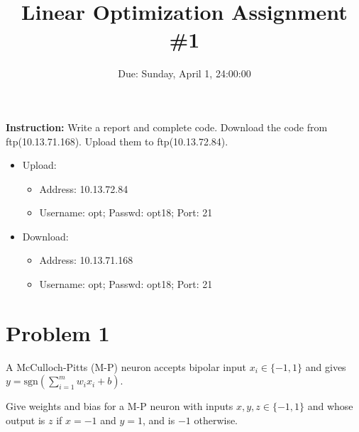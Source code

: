 \documentclass[12pt]{article}
\title{\textbf{Linear Optimization Assignment \#1}}
\author{Due: Sunday, April 1, 24:00:00}
\date{}
\providecommand{\tightlist}{%
	\setlength{\itemsep}{0pt}\setlength{\parskip}{0pt}}
\begin{document}
\maketitle

\textbf{\color{NavyBlue}Instruction:} Write a report and complete code.
Download the code from ftp(10.13.71.168). Upload them to ftp(10.13.72.84).
\begin{itemize}
	\tightlist
	\item Upload:
	      \begin{itemize}
		      \tightlist
		      \item    Address: 10.13.72.84
		      \item Username: opt; Passwd:  opt18; Port: 21
	      \end{itemize}
	\item Download:
	      \begin{itemize}
		      \tightlist
		      \item Address: 10.13.71.168
		      \item  Username: opt; Passwd:  opt18; Port: 21
	      \end{itemize}
\end{itemize}



\section{Problem 1}

A McCulloch-Pitts (M-P) neuron accepts bipolar input $x_i \in \{-1,1\}$ and gives  $y=\mathrm{sgn} (\sum_{i=1}^{m} w_ix_i + b) $.

Give weights and bias for a M-P neuron with inputs
$x,y,z \in \{-1,1\}$ and whose output is  $z$ if $x = -1$ and $y = 1$, and is $-1$ otherwise.


\end{document}
